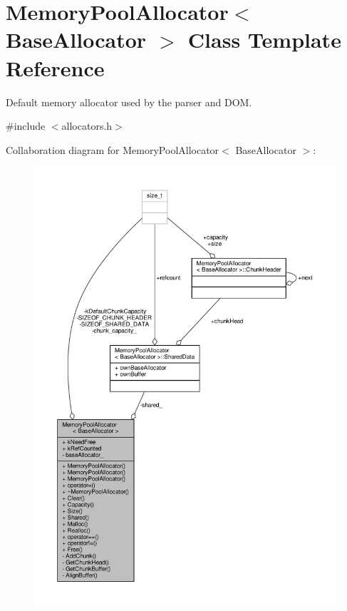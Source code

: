 \hypertarget{classMemoryPoolAllocator}{}\section{Memory\+Pool\+Allocator$<$ Base\+Allocator $>$ Class Template Reference}
\label{classMemoryPoolAllocator}


Default memory allocator used by the parser and D\+OM.  




{\ttfamily \#include $<$allocators.\+h$>$}



Collaboration diagram for Memory\+Pool\+Allocator$<$ Base\+Allocator $>$\+:
\nopagebreak
\begin{figure}[H]
\begin{center}
\leavevmode
\includegraphics[width=350pt]{classMemoryPoolAllocator__coll__graph}
\end{center}
\end{figure}
